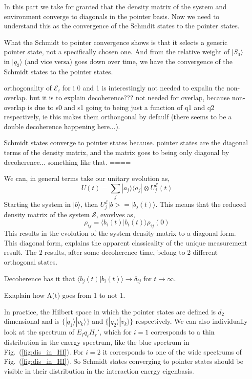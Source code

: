 \documentclass{article}
\begin{document}
In this part we take for granted that the density matrix of the system and environment converge to diagonals in the pointer basis. Now we need to understand this as the convergence of the Schmdit states to the pointer states. 

    
What the Schmidt to pointer convergence shows is that it selects a generic pointer state, not a specifically chosen one.
And from the relative weight of $|S_0\rangle$ in $|q_2\rangle$ (and vice versa) goes down over time, we have the convergence of the Schmidt states to the pointer states. 

orthogonality of $\mathcal{E}_i$ for i 0 and 1 is interestingly not needed to expalin the non-overlap. but it is to explain decoherence??? 
not needed for overlap, because non-overlap is due to s0 and s1 going to being just a function of q1 and q2 respectively, ie this makes them orthongonal by defaulf (there seems to be a double decoherence happening here...). 



Schmidt states converge to pointer states because. pointer states are the diagonal terms of the density matrix, and the matrix goes to being only diagonal by decoherence... something like that.
====





We can, in general terms take our unitary evolution as,
\begin{equation}
    U(t)=\sum_j|a_j\rangle\langle a_j|\otimes U^{\mathcal{E}}_j(t)
\end{equation}
Starting the system in $|b\rangle$, then $U_j^{\mathcal{E}}|b>=|b_j(t)\rangle$. This means that the reduced density matrix of the system $\mathcal{S}$, evovlves as,
\begin{equation}
    \rho_{ij} = \langle b_i(t)|b_i(t)\rangle \rho_{ij}(0)
\end{equation}
This results in the evolution of the system density matrix to a diagonal form. This diagonal form, explains the apparent classicality of the unique measurement result. The 2 results, after some decoherence time, belong to 2 different orthogonal states. 


Decoherence has it that $\langle b_j(t)|b_i(t)\rangle\rightarrow \delta_{ij}$ for $t\rightarrow \infty$. 



Exaplain how A(t) goes from 1 to not 1. 





In practice, the Hilbert space in which the pointer states are defined is $d_2$ dimensional and is $\{|q_1\rangle|v_k\rangle\}$ and $\{|q_2\rangle|v_k\rangle\}$ respectively. We can also individually look at the spectrum of $E_Iq_iH_r'$, which for $i=1$ corresponds to a thin distribution in the energy spectrum, like the blue spectrum in Fig.~(\ref{fig:dis_in_HI}). For $i=2$ it corresponds to one of the wide spectrums of Fig.~(\ref{fig:dis_in_HI}). So Schmidt states converging to pointer states should be visible in their distribution in the interaction energy eigenbasis.
\end{document}
